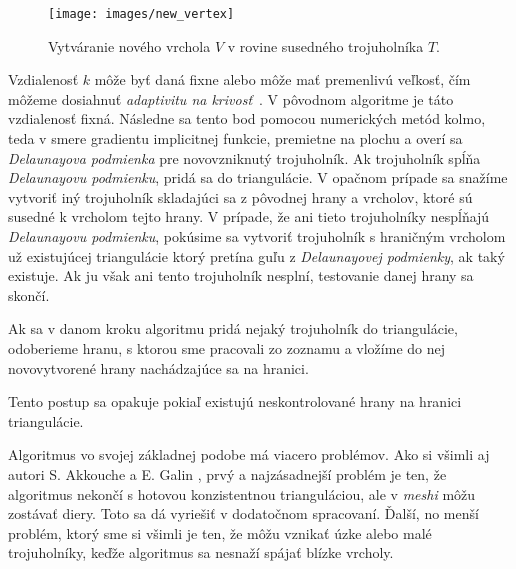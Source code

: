 \begin{figure}
    \centerline{\texttt{[image: images/new\_vertex]}}
    \caption[Vytváranie nového vrchola]
    {Vytváranie nového vrchola $V$ v rovine susedného trojuholníka $T$.}
    \label{obr:new_vertex}
\end{figure}

Vzdialenosť $k$ môže byť daná fixne alebo môže mať premenlivú veľkosť, čím môžeme dosiahnuť 
\textit{adaptivitu na krivosť}~\cite{akkouche2001adaptive}.
V pôvodnom algoritme je táto vzdialenosť fixná. 
Následne sa tento bod pomocou numerických metód kolmo, teda v smere gradientu implicitnej funkcie, 
premietne na plochu a overí sa 
\textit{Delaunayova podmienka} pre novovzniknutý trojuholník. 
Ak trojuholník spĺňa \textit{Delaunayovu podmienku}, pridá sa do triangulácie. V opačnom prípade sa snažíme 
vytvoriť iný trojuholník skladajúci sa z pôvodnej hrany a vrcholov, ktoré sú susedné k vrcholom tejto hrany. 
V prípade, že ani tieto trojuholníky nespĺňajú \textit{Delaunayovu podmienku}, pokúsime sa vytvoriť 
trojuholník s hraničným vrcholom už existujúcej triangulácie ktorý pretína guľu z 
\textit{Delaunayovej podmienky}, ak taký existuje. Ak ju však ani tento trojuholník nesplní, 
testovanie danej hrany sa skončí.

Ak sa v danom kroku algoritmu pridá nejaký trojuholník do triangulácie, odoberieme hranu, 
s ktorou sme pracovali zo zoznamu a vložíme do nej novovytvorené hrany nachádzajúce sa na hranici.

Tento postup sa opakuje pokiaľ existujú neskontrolované hrany na hranici triangulácie.

Algoritmus vo svojej základnej podobe má viacero problémov. Ako si všimli aj autori S. Akkouche 
a E. Galin \cite{akkouche2001adaptive}, prvý a najzásadnejší problém je ten,
že algoritmus nekončí s hotovou konzistentnou trianguláciou, ale v \textit{meshi} môžu zostávať diery. Toto sa
dá vyriešiť v dodatočnom spracovaní. Ďalší, no menší problém, ktorý sme si všimli
je ten, že môžu vznikať úzke alebo malé trojuholníky, keďže algoritmus sa nesnaží spájať blízke vrcholy.

